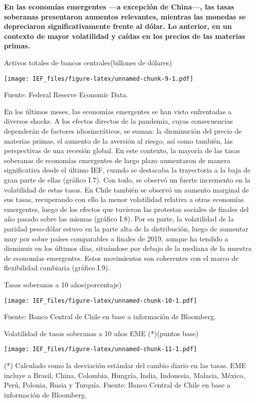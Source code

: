 \documentclass[
]{book}
\begin{document}
\textbf{En las economías emergentes ---a excepción de China---, las tasas soberanas presentaron aumentos relevantes, mientras las monedas se depreciaron significativamente frente al dólar. Lo anterior, en un contexto de mayor volatilidad y caídas en los precios de las materias primas.}

Activos totales de bancos centrales(billones de dólares)

\texttt{[image: IEF\_files/figure-latex/unnamed-chunk-9-1.pdf]}

Fuente: Federal Reserve Economic Data.

En los últimos meses, las economías emergentes se han visto enfrentadas a
diversos shocks. A los efectos directos de la pandemia, cuyas consecuencias
dependerán de factores idiosincráticos, se suman: la disminución del precio
de materias primas, el aumento de la aversión al riesgo, así como también,
las perspectivas de una recesión global. En este contexto, la mayoría de las
tasas soberanas de economías emergentes de largo plazo aumentaron de
manera significativa desde el último IEF, cuando se destacaba la trayectoria
a la baja de gran parte de ellas (gráfico I.7). Con todo, se observó un fuerte
incremento en la volatilidad de estas tasas. En Chile también se observó un
aumento marginal de sus tasas, recuperando con ello la menor volatilidad
relativa a otras economías emergentes, luego de los efectos que tuvieron las
protestas sociales de finales del año pasado sobre las mismas (gráfico I.8). Por
su parte, la volatilidad de la paridad peso-dólar estuvo en la parte alta de la
distribución, luego de aumentar muy por sobre países comparables a finales de
2019, aunque ha tendido a disminuir en los últimos días, situándose por debajo
de la mediana de la muestra de economías emergentes. Estos movimientos son
coherentes con el marco de flexibilidad cambiaria (gráfico I.9).

Tasas soberanas a 10 años(porcentaje)

\texttt{[image: IEF\_files/figure-latex/unnamed-chunk-10-1.pdf]}

Fuente: Banco Central de Chile en base a información de Bloomberg.

Volatilidad de tasas soberanas a 10 años EME (*)(puntos base)

\texttt{[image: IEF\_files/figure-latex/unnamed-chunk-11-1.pdf]}

(*) Calculado como la desviación estándar del cambio diario en las tasas. EME incluye a Brasil, China, Colombia, Hungría, India, Indonesia, Malasia, México, Perú, Polonia, Rusia y Turquía.
Fuente: Banco Central de Chile en base a información de Bloomberg.
\end{document}
